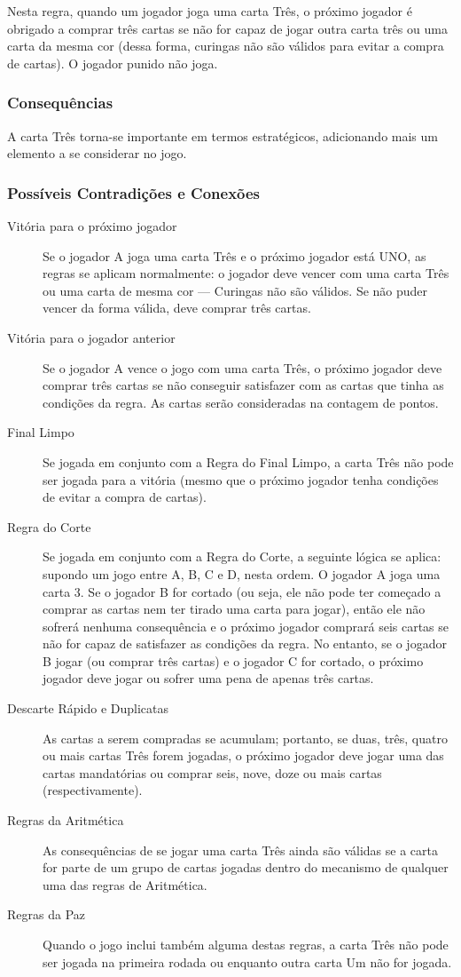 Nesta regra, quando um jogador joga uma carta Três, o próximo jogador é obrigado a comprar três cartas se não for capaz de jogar outra carta três ou uma carta da mesma cor (dessa forma, curingas não são válidos para evitar a compra de cartas). O jogador punido não joga.

\subsubsection{Consequências}

A carta Três torna-se importante em termos estratégicos, adicionando mais um elemento a se considerar no jogo.

\subsubsection{Possíveis Contradições e Conexões}

\begin{description}
\item[Vitória para o próximo jogador]{Se o jogador A joga uma carta Três e o próximo jogador está UNO, as regras se aplicam normalmente: o jogador deve vencer com uma carta Três ou uma carta de mesma cor --- Curingas não são válidos. Se não puder vencer da forma válida, deve comprar três cartas.}
\item[Vitória para o jogador anterior]{Se o jogador A vence o jogo com uma carta Três, o próximo jogador deve comprar três cartas se não conseguir satisfazer com as cartas que tinha as condições da regra. As cartas serão consideradas na contagem de pontos.}
\item[Final Limpo]{Se jogada em conjunto com a Regra do Final Limpo, a carta Três não pode ser jogada para a vitória (mesmo que o próximo jogador tenha condições de evitar a compra de cartas).}
\item[Regra do Corte]{Se jogada em conjunto com a Regra do Corte, a seguinte lógica se aplica: supondo um jogo entre A, B, C e D, nesta ordem. O jogador A joga uma carta 3. Se o jogador B for cortado (ou seja, ele não pode ter começado a comprar as cartas nem ter tirado uma carta para jogar), então ele não sofrerá nenhuma consequência e o próximo jogador comprará seis cartas se não for capaz de satisfazer as condições da regra. No entanto, se o jogador B jogar (ou comprar três cartas) e o jogador C for cortado, o próximo jogador deve jogar ou sofrer uma pena de apenas três cartas.}
\item[Descarte Rápido e Duplicatas]{As cartas a serem compradas se acumulam; portanto, se duas, três, quatro ou mais cartas Três forem jogadas, o próximo jogador deve jogar uma das cartas mandatórias ou comprar seis, nove, doze ou mais cartas (respectivamente).}
\item[Regras da Aritmética]{As consequências de se jogar uma carta Três ainda são válidas se a carta for parte de um grupo de cartas jogadas dentro do mecanismo de qualquer uma das regras de Aritmética.}
\item[Regras da Paz]{Quando o jogo inclui também alguma destas regras, a carta Três não pode ser jogada na primeira rodada ou enquanto outra carta Um não for jogada.}
\end{description}

